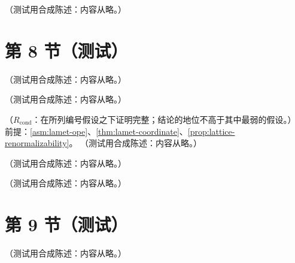 \begin{proposition}\label{prop:lamet-truncation}
（测试用合成陈述：内容从略。）
\end{proposition}

\section{第 8 节（测试）}\label{sec:lamet-schemes}

\begin{proposition}\label{prop:lamet-slepian}
（测试用合成陈述：内容从略。）
\end{proposition}

\begin{example}[截断误差与可恢复模式数的数值]\label{ex:lamet-fourier-numbers}
（测试用合成陈述：内容从略。）
\end{example}

\begin{proposition}\label{prop:lamet-tmc}
（$R_{\mathrm{cond}}$：在所列编号假设之下证明完整；结论的地位不高于其中最弱的假设。）
前提：\cref{asm:lamet-ope}、\cref{thm:lamet-coordinate}、\cref{prop:lattice-renormalizability}。
（测试用合成陈述：内容从略。）
\end{proposition}

\begin{example}[$K_N$ 与 $K^\perp_N$（$N\le4$）]\label{ex:lamet-tmc-moments}
（测试用合成陈述：内容从略。）
\end{example}

\begin{lemma}\label{lem:lamet-fourier}
（测试用合成陈述：内容从略。）
\end{lemma}

\section{第 9 节（测试）}\label{sec:lamet-fourier}

\begin{corollary}[端点二分]\label{cor:lamet-endpoint}
（测试用合成陈述：内容从略。）
\end{corollary}

